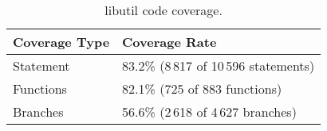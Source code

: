 
\begin{table}[h]

\centering
\begin{tabular}{|l|l|}
\hline
\textbf{Coverage Type} & \textbf{Coverage Rate} \\
\hline
Statement     & 83.2\% (8\,817 of 10\,596 statements)\\
Functions     & 82.1\% (725 of 883 functions)\\
Branches      & 56.6\% (2\,618 of 4\,627 branches)\\
\hline
\end{tabular}
\caption{libutil code coverage.}
\label{table:gslibutil_coverage}

\end{table}